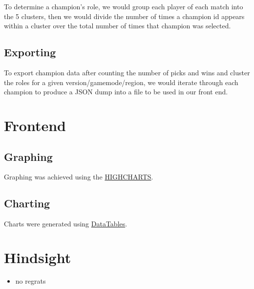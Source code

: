 \documentclass{article}
\begin{document}
To determine a champion's role,  we would group each player of each match into the 5 clusters, then we would divide the number of times a champion id appears within a cluster over the total number of times that champion was selected.

\subsection{Exporting}
To export champion data after counting the number of picks and wins and cluster the roles for a given version/gamemode/region, we would iterate through each champion to produce a JSON dump into a file to be used in our front end.



\section{Frontend}

\subsection{Graphing}
Graphing was achieved using the \href{http://www.highcharts.com/}{HIGHCHARTS}.

\subsection{Charting}
Charts were generated using \href{https://www.datatables.net/}{DataTables}.


\section{Hindsight}

\begin{itemize}
    \item no regrats
\end{itemize}


\end{document}
